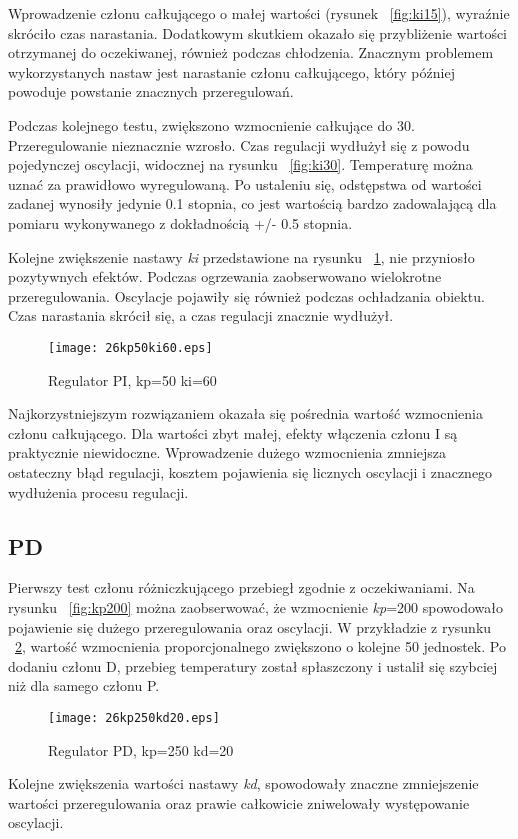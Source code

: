 Wprowadzenie członu całkującego o małej wartości (rysunek ~\ref{fig:ki15}), wyraźnie skróciło czas narastania. Dodatkowym skutkiem okazało się przybliżenie wartości otrzymanej do oczekiwanej, również podczas chłodzenia. Znacznym problemem wykorzystanych nastaw jest narastanie członu całkującego, który później powoduje powstanie znacznych przeregulowań.

Podczas kolejnego testu, zwiększono wzmocnienie całkujące do 30. Przeregulowanie nieznacznie wzrosło. Czas regulacji wydłużył się z powodu pojedynczej oscylacji, widocznej na rysunku ~\ref{fig:ki30}. Temperaturę można uznać za prawidłowo wyregulowaną. Po ustaleniu się, odstępstwa od wartości zadanej wynosiły jedynie 0.1 stopnia, co jest wartością bardzo zadowalającą dla pomiaru wykonywanego z dokładnością +/- 0.5 stopnia.

Kolejne zwiększenie nastawy \textit{ki} przedstawione na rysunku ~\ref{fig:ki60}, nie przyniosło pozytywnych efektów. Podczas ogrzewania zaobserwowano wielokrotne przeregulowania. Oscylacje pojawiły się również podczas ochładzania obiektu. Czas narastania skrócił się, a czas regulacji znacznie wydłużył.

\begin{figure}[H]
	\centering
	\texttt{[image: 26kp50ki60.eps]}
	\caption{Regulator PI, kp=50 ki=60}
	\label{fig:ki60}
\end{figure}

Najkorzystniejszym rozwiązaniem okazała się pośrednia wartość wzmocnienia członu całkującego. Dla wartości zbyt małej, efekty włączenia członu I są praktycznie niewidoczne. Wprowadzenie dużego wzmocnienia zmniejsza ostateczny błąd regulacji, kosztem pojawienia się licznych oscylacji i znacznego wydłużenia procesu regulacji.
\newpage

\subsection{PD}
Pierwszy test członu różniczkującego przebiegł zgodnie z oczekiwaniami. Na rysunku ~\ref{fig:kp200} można zaobserwować, że wzmocnienie \textit{kp}=200 spowodowało pojawienie się dużego przeregulowania oraz oscylacji. W przykładzie z rysunku ~\ref{fig:kd20}, wartość wzmocnienia proporcjonalnego zwiększono o kolejne 50 jednostek. Po dodaniu członu D, przebieg temperatury został spłaszczony i ustalił się szybciej niż dla samego członu P.
\begin{figure}[H]
	\centering
	\texttt{[image: 26kp250kd20.eps]}
	\caption{Regulator PD, kp=250 kd=20}
	\label{fig:kd20}
\end{figure}
Kolejne zwiększenia wartości nastawy \textit{kd}, spowodowały znaczne zmniejszenie wartości przeregulowania oraz prawie całkowicie zniwelowały występowanie oscylacji.

